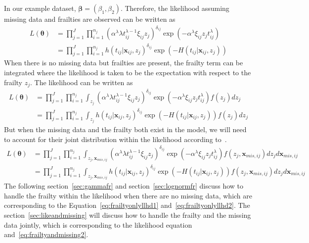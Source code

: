 \documentclass[preprint,12pt]{elsarticle}
\begin{document}
In our example dataset, $\boldsymbol{\beta}=(\beta_1, \beta_2)$. 
Therefore, the likelihood assuming missing data and frailties are observed can be written as
\begin{align}
    L(\boldsymbol{\theta})&=\prod_{j=1}^J\prod_{i=1}^{n_j}(\alpha^{\lambda}\lambda t_{ij}^{\lambda-1}\xi_{ij}z_j)^{\delta_{ij}}\exp(-\alpha^{\lambda}\xi_{ij}z_j t_{ij}^{\lambda})\\
    &=\prod_{j=1}^J\prod_{i=1}^{n_j}h(t_{ij}|\mathbf{x}_{ij},z_j)^{\delta_{ij}}\exp(-H(t_{ij}|\mathbf{x}_{ij},z_j))
\end{align}
When there is no missing data but frailties are present, the frailty term can be integrated where the likelihood is taken to be the expectation with respect to the frailty $z_j$. 
The likelihood can be written as 
\begin{align}
    L(\boldsymbol{\theta})&=\prod_{j=1}^J\prod_{i=1}^{n_j}\int_{z_j}(\alpha^{\lambda}\lambda t_{ij}^{\lambda-1}\xi_{ij}z_j)^{\delta_{ij}}\exp(-\alpha^{\lambda}\xi_{ij}z_j t_{ij}^{\lambda})f(z_j)dz_j\label{eq:frailtyonlyllhd1}\\
    &=\prod_{j=1}^J\prod_{i=1}^{n_j}\int_{z_j}h(t_{ij}|\mathbf{x}_{ij},z_j)^{\delta_{ij}}\exp(-H(t_{ij}|\mathbf{x}_{ij},z_j))f(z_j)dz_j\label{eq:frailtyonlyllhd2}
\end{align}
But when the missing data and the frailty both exist in the model, we will need to account for their joint distribution within the likelihood according to~\citet{herring2002frailty}. 
\begin{align} 
    L(\boldsymbol{\theta})&=\prod_{j=1}^J\prod_{i=1}^{n_j}\int_{z_j,\mathbf{x}_{mis,ij}}(\alpha^{\lambda}\lambda t_{ij}^{\lambda-1}\xi_{ij}z_j)^{\delta_{ij}}\exp(-\alpha^{\lambda}\xi_{ij}z_j t_{ij}^{\lambda})f(z_j, \mathbf{x}_{mis,ij})dz_jd\mathbf{x}_{mis,ij}\label{eq:frailtyandmissing1}\\
    &=\prod_{j=1}^J\prod_{i=1}^{n_j}\int_{z_j,\mathbf{x}_{mis,ij}}h(t_{ij}|\mathbf{x}_{ij},z_j)^{\delta_{ij}}\exp(-H(t_{ij}|\mathbf{x}_{ij},z_j))f(z_j, \mathbf{x}_{mis,ij})dz_jd\mathbf{x}_{mis,ij}\label{eq:frailtyandmissing2}
\end{align}
The following section~\ref{sec:gammafr} and section~\ref{sec:lognormfr} discuss how to handle the frailty within the likelihood when there are no missing data, which are corresponding to the Equation~\ref{eq:frailtyonlyllhd1} and~\ref{eq:frailtyonlyllhd2}. 
The section~\ref{sec:likeandmissing} will discuss how to handle the frailty and the missing data jointly, which is corresponding to the likelihood equation~\label{eq:frailtyandmissing1} and~\ref{eq:frailtyandmissing2}.
\end{document}
